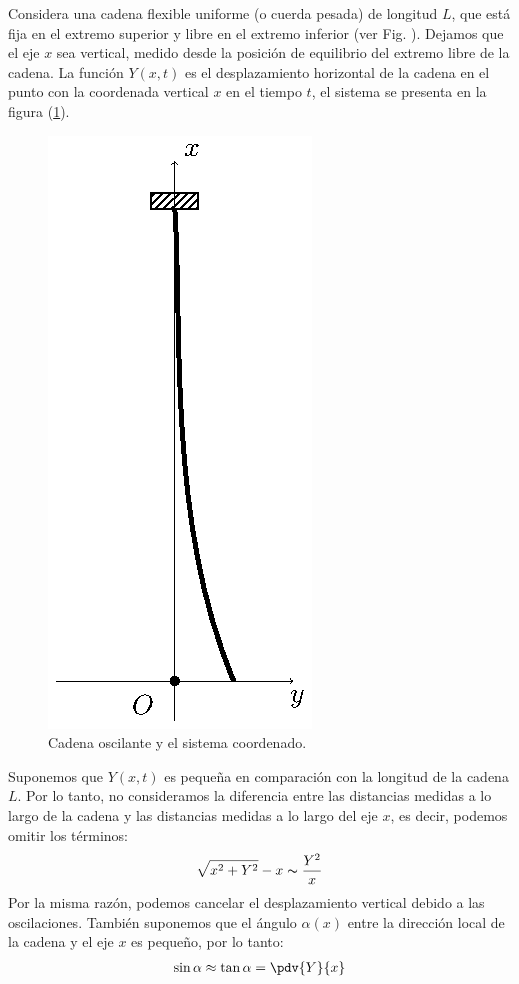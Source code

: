 Considera una cadena flexible uniforme (o cuerda pesada) de longitud $L$, que está fija en el extremo superior y libre en el extremo inferior (ver Fig. ). Dejamos que el eje $x$ sea vertical, medido desde la posición de equilibrio del extremo libre de la cadena. La función $Y (x, t)$ es el desplazamiento horizontal de la cadena en el punto con la coordenada vertical $x$ en el tiempo $t$, el sistema se presenta en la figura (\ref{fig:figura_cadena_inicial}).
\begin{figure}[H]
    \centering
    \includegraphics[scale=1]{Imagenes/Cadena_Oscilante_01.eps}
    \caption{Cadena oscilante y el sistema coordenado.}
    \label{fig:figura_cadena_inicial}
\end{figure}

Suponemos que $Y (x, t)$ es pequeña en comparación con la longitud de la cadena $L$. Por lo tanto, no consideramos  la diferencia entre las distancias medidas a lo largo de la cadena y las distancias medidas a lo largo del eje $x$, es decir, podemos omitir los términos:
\begin{align*}
\sqrt{x^{2} + Y^{2}} - x \thicksim \dfrac{Y^{2}}{x}
\end{align*}
Por la misma razón, podemos cancelar el desplazamiento vertical debido a las oscilaciones. También suponemos que el ángulo $\alpha (x)$ entre la dirección local de la cadena y el eje $x$ es pequeño, por lo tanto:
\begin{align}
\sin \alpha \approx \tan \alpha = \pdv{Y}{x}
\label{eq:ecuacion_01}
\end{align}

